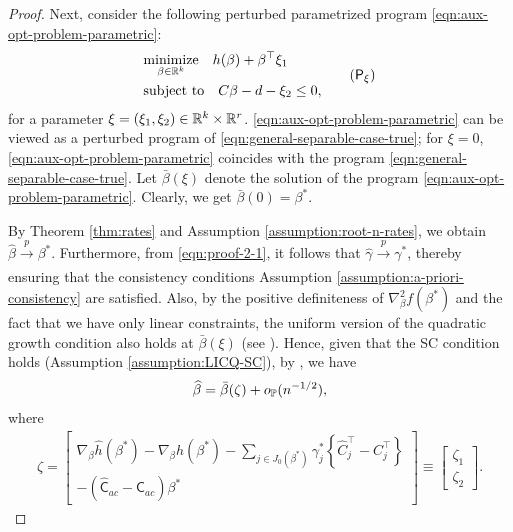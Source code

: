 \begin{proof}
Next, consider the following perturbed parametrized program \ref{eqn:aux-opt-problem-parametric}:
\begin{equation}
\label{eqn:aux-opt-problem-parametric}
    \begin{aligned}
        &\underset{\beta \in \R^k}{\text{minimize}} \quad h(\beta) + \beta^\top\xi_1 \\
        & \text{subject to} \quad C\beta - d - \xi_2 \leq 0,
    \end{aligned} \tag{$\mathsf{P}_\xi$}  
\end{equation} 
for a parameter $\xi = (\xi_1, \xi_2) \in \mathbb{R}^k \times \mathbb{R}^{r}$. \eqref{eqn:aux-opt-problem-parametric} can be viewed as a perturbed program of \eqref{eqn:general-separable-case-true}; for $\xi=0$, \eqref{eqn:aux-opt-problem-parametric} coincides with the program \eqref{eqn:general-separable-case-true}. Let $\bar{\beta}(\xi)$ denote the solution of the program \ref{eqn:aux-opt-problem-parametric}. Clearly, we get $\bar{\beta}(0) = \beta^*$.

By Theorem \ref{thm:rates} and Assumption \ref{assumption:root-n-rates}, we obtain $\widehat{\beta} \xrightarrow[]{p} \beta^*$. Furthermore, from \eqref{eqn:proof-2-1}, it follows that $\widehat{\gamma} \xrightarrow[]{p} \gamma^*$, thereby ensuring that the consistency conditions Assumption \ref{assumption:a-priori-consistency} are satisfied. Also, by the positive definiteness of $\nabla_\beta^2f(\beta^*)$ and the fact that we have only linear constraints, the uniform version of the quadratic growth condition also holds at $\bar{\beta}(\xi)$ (see \citet[][Assumption A3]{shapiro1993asymptotic}). Hence, given that the SC condition holds (Assumption \ref{assumption:LICQ-SC}), by \citet[][Theorem 3.1]{shapiro1993asymptotic}, we have
\begin{align} \label{eqn:proof-2-2}
    \widehat{\beta} = \bar{\beta}(\zeta) + o_{\mathbb{P}}(n^{-1/2}),
\end{align}
where 
\begin{align*}
    \zeta = \begin{bmatrix}
    \nabla_\beta\widehat{h}(\beta^*) - \nabla_\beta h(\beta^*) - \sum_{j \in J_0(\beta^*)}\gamma^*_j\left\{ \widehat{C}_j^\top - C_j^\top \right\} \\
    -(\widehat{\mathsf{C}}_{ac} - \mathsf{C}_{ac})\beta^*
    \end{bmatrix} \equiv \begin{bmatrix}
    \zeta_1 \\
    \zeta_2
    \end{bmatrix}.
\end{align*}


\end{proof}
